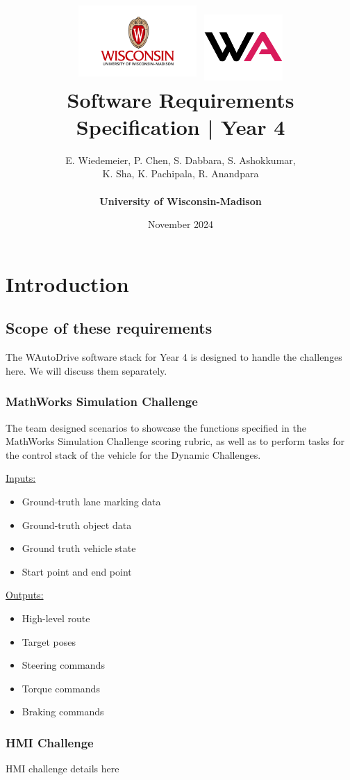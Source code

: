 \documentclass[12pt]{article}
\title{
{\includegraphics[width=4.5cm, height=3cm]{images/uwlogo.png}
\includegraphics[width=3cm, height=2.5cm]{images/walogo.png}}
\\
{Software Requirements Specification | Year 4}
}
\author{E. Wiedemeier, P. Chen, S. Dabbara, S. Ashokkumar, \\ K. Sha,  K. Pachipala, R. Anandpara \\ \\ \textbf{University of Wisconsin-Madison}}
\date{November 2024}
\begin{document}
\newpage
\maketitle
\tableofcontents

\newpage
\maketitle

\section{Introduction}
\subsection{Scope of these requirements}
The WAutoDrive software stack for Year 4 is designed to handle the challenges here. We will discuss them separately.

\subsubsection{MathWorks Simulation Challenge}
The team designed scenarios to showcase the functions specified in the MathWorks Simulation Challenge scoring rubric, as well as to perform tasks for the control stack of the vehicle for the Dynamic Challenges.

\underline{Inputs:}
\begin{itemize}
    \item Ground-truth lane marking data
    \item Ground-truth object data
    \item Ground truth vehicle state
    \item Start point and end point
\end{itemize}
\underline{Outputs:}
\begin{itemize}
    \item High-level route
    \item Target poses
    \item Steering commands
    \item Torque commands
    \item Braking commands
\end{itemize}

\subsubsection{HMI Challenge}
HMI challenge details here 
\end{document}
